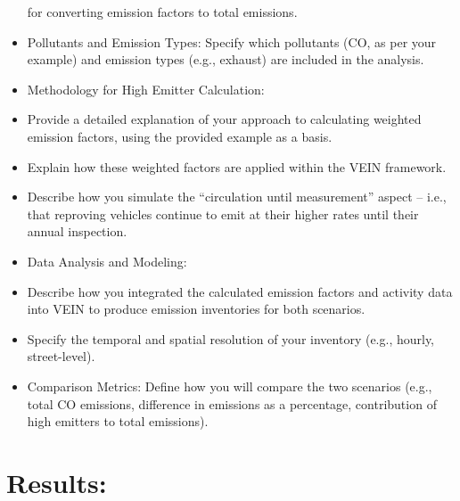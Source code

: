 \documentclass[atmosphere,article,submit,moreauthors,pdftex]{Definitions/mdpi}
\begin{document}
\begin{itemize}
  for converting emission factors to total emissions.
\item
  Pollutants and Emission Types: Specify which pollutants (CO, as per
  your example) and emission types (e.g., exhaust) are included in the
  analysis.
\item
  Methodology for High Emitter Calculation:
\item
  Provide a detailed explanation of your approach to calculating
  weighted emission factors, using the provided example as a basis.
\item
  Explain how these weighted factors are applied within the VEIN
  framework.
\item
  Describe how you simulate the ``circulation until measurement'' aspect
  -- i.e., that reproving vehicles continue to emit at their higher
  rates until their annual inspection.
\item
  Data Analysis and Modeling:
\item
  Describe how you integrated the calculated emission factors and
  activity data into VEIN to produce emission inventories for both
  scenarios.
\item
  Specify the temporal and spatial resolution of your inventory (e.g.,
  hourly, street-level).
\item
  Comparison Metrics: Define how you will compare the two scenarios
  (e.g., total CO emissions, difference in emissions as a percentage,
  contribution of high emitters to total emissions).
\end{itemize}

\section{Results:}\label{results}
\end{document}
